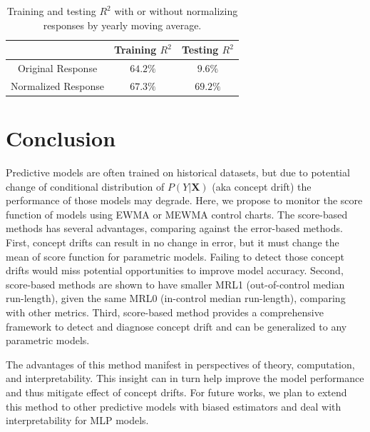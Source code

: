 \documentclass[twoside,11pt]{article}
\begin{document}
\begin{table}[!htbp]
\centering
\begin{tabular}{|c|c|c|} \hline
 & Training $R^2$ & Testing $R^2$ \\ \hline
 Original Response & $64.2\%$ & $9.6\%$ \\ \hline 
 Normalized Response & $\bm{67.3}\%$ & $\bm{69.2}\%$ \\ \hline
\end{tabular}
\caption{Training and testing $R^2$ with or without normalizing responses by yearly moving average.}
\label{table:fit_pred_preproc}
\end{table}

\section{Conclusion}
Predictive models are often trained on historical datasets, but due to potential change of conditional distribution of $P (Y|\bm {X})$ (aka concept drift) the performance of those models may degrade. Here, we propose to monitor the score function of models using EWMA or MEWMA control charts. The score-based methods has several advantages, comparing against the error-based methods. First, concept drifts can result in no change in error, but it must change the mean of score function for parametric models. Failing to detect those concept drifts would miss potential opportunities to improve model accuracy. Second, score-based methods are shown to have smaller MRL1 (out-of-control median run-length), given the same MRL0 (in-control median run-length), comparing with other metrics. Third, score-based method provides a comprehensive framework to detect and diagnose concept drift and can be generalized to any parametric models. 

The advantages of this method manifest in perspectives of theory, computation, and interpretability. This insight can in turn help improve the model performance and thus mitigate effect of concept drifts. For future works, we plan to extend this method to other predictive models with biased estimators and deal with interpretability for MLP models.

\end{document}
